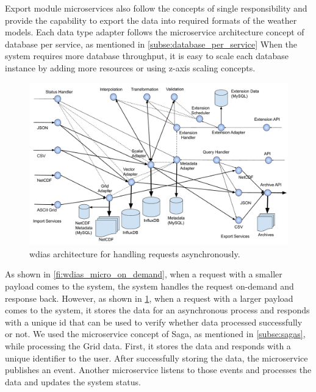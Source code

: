 Export module microservices also follow the concepts of single responsibility and provide the capability to export the data into required formats of the weather models. Each data type adapter follows the microservice architecture concept of database per service, as mentioned in \cref{subse:database_per_service} When the system requires more database throughput, it is easy to scale each database instance by adding more resources or using z-axis scaling concepts.

\begin{figure}[htp]
    \centering
    \includegraphics[width=1\textwidth]{method/microservice/microservice_architecture-handle_on_async-v4.pdf}
    \caption{\acrshort{wdias} architecture for handling requests asynchronously.}
    \label{fi:wdias_micro_async}
\end{figure}

As shown in \cref{fi:wdias_micro_on_demand}, when a request with a smaller payload comes to the system, the system handles the request on-demand and response back. However, as shown in \cref{fi:wdias_micro_async}, when a request with a larger payload comes to the system, it stores the data for an asynchronous process and responds with a unique id that can be used to verify whether data processed successfully or not. We used the microservice concept of Saga, as mentioned in \cref{subse:sagas}, while processing the Grid data. First, it stores the data and responds with a unique identifier to the user. After successfully storing the data, the microservice publishes an event. Another microservice listens to those events and processes the data and updates the system status.


